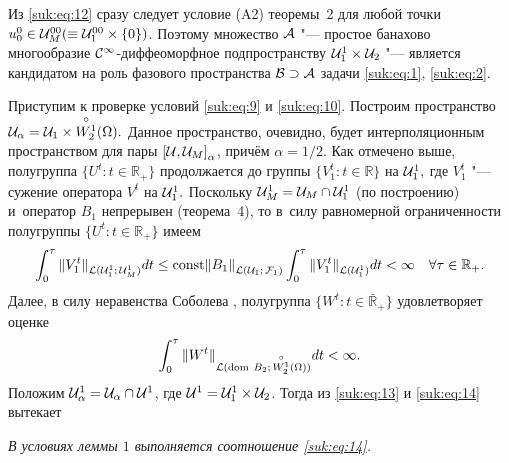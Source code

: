 \smallskip

\begin{remark}[4]  Из  \eqref{suk:eq:12} сразу следует условие (A2) теоремы~2 для  любой точки $u^0_0 \in {\cal U}_M^{00}(\equiv {\cal U}_1^{00} \times \{ 0 \})$. 
Поэтому  множество   ${\cal A}$  "---  простое   банахово   многообразие ${\cal C}^{\infty}$-диффеоморфное подпространству  ${\cal U}_1^1 \times {\cal U}_2$  "---  является кандидатом на роль фазового пространства ${\cal B} \supset {\cal A}$ задачи \eqref{suk:eq:1}, \eqref{suk:eq:2}.
\end{remark}

Приступим  к   проверке  условий  \eqref{suk:eq:9}  и  \eqref{suk:eq:10}.  
Построим пространство   ${\cal U}_{\alpha}={\cal U}_1 \times {\stackrel{\circ}{W_2^1}} (\Omega ) .$   
Данное  пространство, очевидно,  будет интерполяционным пространством  для  пары ${[{\cal U}, {\cal U}_M]}_{\alpha }$, причём $\alpha =1/2 .$   
Как отмечено выше, полугруппа $ \{ U^t: t \in {\mathbb R}_{+} \} $ продолжается до группы $\{ V^t_1: t \in \mathbb R \}$ на ${\cal U}_1^1 ,$ где
$V_1^t$  "---   сужение  оператора   $V^t$   на  ${\cal U}_1^1 .$
Поскольку  ${\cal U}_M^1={\cal U}_M \cap {\cal U}_1^1$  (по построению) и~оператор $B_1$ непрерывен  (теорема~4),  то  в~силу равномерной ограниченности полугруппы $\{ U^t: t \in {\mathbb R}_{+} \}$ имеем 
\begin{equation}
\int_0^{\tau} {\| V_1^t \|}_{{\cal L}({\cal U}_1^1;\,{\cal U}_M^1)} dt \leq
{\rm const} {\| B_1 \|}_{{\cal L} ({\cal U}_1; \,{\cal F}_1)}
\int_0^{\tau} {\| V_1^t \|}_{{\cal L}({\cal U}_1^1)} dt < \infty
\quad \forall \tau \in {\mathbb R}_{+}. 
\label{suk:eq:13}
\end{equation}
Далее, в силу неравенства Соболева \cite[гл. 9]{suk:cite:10}, полугруппа $\{ W^t: t \in { \bar {\mathbb R}}_{+} \} $ удовлетворяет оценке
\begin{equation}
\int_0^{\tau} {\| W^t \|}_{{\cal L} ({\rm dom~} B_2;\,{\stackrel{\circ}{W_2^1} (\Omega)})} dt < \infty.
\label{suk:eq:14}
\end{equation}
Положим ${\cal U}_{\alpha}^1={\cal U}_{\alpha} \cap {\cal U}^1$, где ${\cal U}^1={\cal U}_1^1 \times {\cal U}_2$. Тогда из \eqref{suk:eq:13} и \eqref{suk:eq:14} вытекает 

\smallskip

\begin{lemma}[3]{\it В условиях леммы $1$ выполняется соотношение \eqref{suk:eq:14}.}
 \end{lemma}

